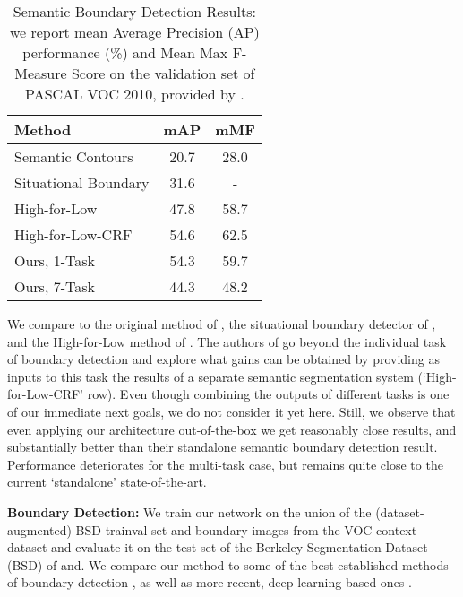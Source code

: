 \documentclass[10pt,twocolumn,letterpaper]{article}
\begin{document}
 \begin{table}[!h]
 	\begin{tabular}{|l|c|c|} \hline
 		Method			&  mAP & mMF 	 		
 		\\\hline	\hline
 		Semantic Contours \cite{hariharan2011semantic}  & 20.7		&   28.0  	\\\hline
 		Situational Boundary \cite{UijlingsF15} & 31.6 & -  \\\hline
 		High-for-Low \cite{BertasiusST15} 	&  47.8  &  58.7 \\\hline
 		High-for-Low-CRF \cite{BertasiusST15} & 54.6 & 62.5 \\\hline
 		Ours, 1-Task & 54.3 & 59.7 \\\hline
 		Ours, 7-Task & 44.3 & 48.2 \\\hline
 	\end{tabular}
 	\caption{Semantic Boundary Detection Results: we report mean Average Precision (AP) performance (\%) and  Mean Max F-Measure Score on the validation set of PASCAL VOC 2010, provided by \cite{hariharan2011semantic}.}
 	\label{table:results_ap}
 \end{table}
 
 We compare to the original method of \cite{hariharan2011semantic}, the situational boundary detector of \cite{UijlingsF15}, and the High-for-Low method of \cite{BertasiusST15}. The authors of \cite{BertasiusST15} go beyond the individual task of boundary detection and explore what gains can be obtained by providing as inputs to this task the results of a separate semantic segmentation system (`High-for-Low-CRF' row). Even though combining the outputs of different tasks is one of our immediate next goals, we do not consider it yet here. Still, we observe that even applying our architecture out-of-the-box we get reasonably close results, and substantially better than their standalone semantic boundary detection result. Performance deteriorates for the multi-task case, but remains quite close to the current `standalone' state-of-the-art. 
 
 
 \textbf{Boundary Detection:} We  train our network on the union of the (dataset-augmented) BSD trainval set and boundary images from the VOC context dataset \cite{context} and evaluate it on the test set of the Berkeley Segmentation Dataset (BSD)  of \cite{MFTM01} and. We compare our method to some of the best-established methods of boundary detection \cite{berkeley11,sfs}, as well as more recent, deep learning-based ones \cite{aistat,ganin2014n,shi15,iclrbnd,shen2015deepcontour,hed,iclr16}. 
 
\end{document}
